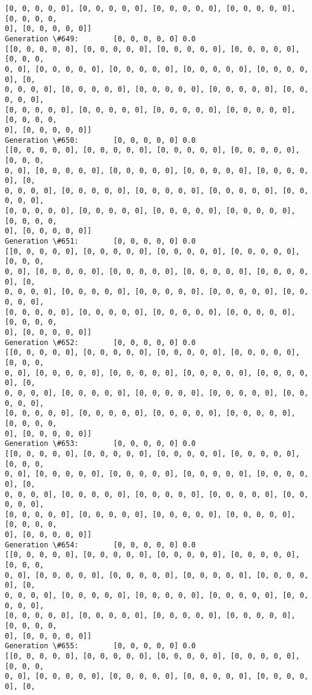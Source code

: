 \documentclass[11pt]{article}
\begin{document}
\begin{Verbatim}[commandchars=\\\{\}]
[0, 0, 0, 0, 0], [0, 0, 0, 0, 0], [0, 0, 0, 0, 0], [0, 0, 0, 0, 0], [0, 0, 0, 0,
0], [0, 0, 0, 0, 0]]
Generation \#649:        [0, 0, 0, 0, 0] 0.0
[[0, 0, 0, 0, 0], [0, 0, 0, 0, 0], [0, 0, 0, 0, 0], [0, 0, 0, 0, 0], [0, 0, 0,
0, 0], [0, 0, 0, 0, 0], [0, 0, 0, 0, 0], [0, 0, 0, 0, 0], [0, 0, 0, 0, 0], [0,
0, 0, 0, 0], [0, 0, 0, 0, 0], [0, 0, 0, 0, 0], [0, 0, 0, 0, 0], [0, 0, 0, 0, 0],
[0, 0, 0, 0, 0], [0, 0, 0, 0, 0], [0, 0, 0, 0, 0], [0, 0, 0, 0, 0], [0, 0, 0, 0,
0], [0, 0, 0, 0, 0]]
Generation \#650:        [0, 0, 0, 0, 0] 0.0
[[0, 0, 0, 0, 0], [0, 0, 0, 0, 0], [0, 0, 0, 0, 0], [0, 0, 0, 0, 0], [0, 0, 0,
0, 0], [0, 0, 0, 0, 0], [0, 0, 0, 0, 0], [0, 0, 0, 0, 0], [0, 0, 0, 0, 0], [0,
0, 0, 0, 0], [0, 0, 0, 0, 0], [0, 0, 0, 0, 0], [0, 0, 0, 0, 0], [0, 0, 0, 0, 0],
[0, 0, 0, 0, 0], [0, 0, 0, 0, 0], [0, 0, 0, 0, 0], [0, 0, 0, 0, 0], [0, 0, 0, 0,
0], [0, 0, 0, 0, 0]]
Generation \#651:        [0, 0, 0, 0, 0] 0.0
[[0, 0, 0, 0, 0], [0, 0, 0, 0, 0], [0, 0, 0, 0, 0], [0, 0, 0, 0, 0], [0, 0, 0,
0, 0], [0, 0, 0, 0, 0], [0, 0, 0, 0, 0], [0, 0, 0, 0, 0], [0, 0, 0, 0, 0], [0,
0, 0, 0, 0], [0, 0, 0, 0, 0], [0, 0, 0, 0, 0], [0, 0, 0, 0, 0], [0, 0, 0, 0, 0],
[0, 0, 0, 0, 0], [0, 0, 0, 0, 0], [0, 0, 0, 0, 0], [0, 0, 0, 0, 0], [0, 0, 0, 0,
0], [0, 0, 0, 0, 0]]
Generation \#652:        [0, 0, 0, 0, 0] 0.0
[[0, 0, 0, 0, 0], [0, 0, 0, 0, 0], [0, 0, 0, 0, 0], [0, 0, 0, 0, 0], [0, 0, 0,
0, 0], [0, 0, 0, 0, 0], [0, 0, 0, 0, 0], [0, 0, 0, 0, 0], [0, 0, 0, 0, 0], [0,
0, 0, 0, 0], [0, 0, 0, 0, 0], [0, 0, 0, 0, 0], [0, 0, 0, 0, 0], [0, 0, 0, 0, 0],
[0, 0, 0, 0, 0], [0, 0, 0, 0, 0], [0, 0, 0, 0, 0], [0, 0, 0, 0, 0], [0, 0, 0, 0,
0], [0, 0, 0, 0, 0]]
Generation \#653:        [0, 0, 0, 0, 0] 0.0
[[0, 0, 0, 0, 0], [0, 0, 0, 0, 0], [0, 0, 0, 0, 0], [0, 0, 0, 0, 0], [0, 0, 0,
0, 0], [0, 0, 0, 0, 0], [0, 0, 0, 0, 0], [0, 0, 0, 0, 0], [0, 0, 0, 0, 0], [0,
0, 0, 0, 0], [0, 0, 0, 0, 0], [0, 0, 0, 0, 0], [0, 0, 0, 0, 0], [0, 0, 0, 0, 0],
[0, 0, 0, 0, 0], [0, 0, 0, 0, 0], [0, 0, 0, 0, 0], [0, 0, 0, 0, 0], [0, 0, 0, 0,
0], [0, 0, 0, 0, 0]]
Generation \#654:        [0, 0, 0, 0, 0] 0.0
[[0, 0, 0, 0, 0], [0, 0, 0, 0, 0], [0, 0, 0, 0, 0], [0, 0, 0, 0, 0], [0, 0, 0,
0, 0], [0, 0, 0, 0, 0], [0, 0, 0, 0, 0], [0, 0, 0, 0, 0], [0, 0, 0, 0, 0], [0,
0, 0, 0, 0], [0, 0, 0, 0, 0], [0, 0, 0, 0, 0], [0, 0, 0, 0, 0], [0, 0, 0, 0, 0],
[0, 0, 0, 0, 0], [0, 0, 0, 0, 0], [0, 0, 0, 0, 0], [0, 0, 0, 0, 0], [0, 0, 0, 0,
0], [0, 0, 0, 0, 0]]
Generation \#655:        [0, 0, 0, 0, 0] 0.0
[[0, 0, 0, 0, 0], [0, 0, 0, 0, 0], [0, 0, 0, 0, 0], [0, 0, 0, 0, 0], [0, 0, 0,
0, 0], [0, 0, 0, 0, 0], [0, 0, 0, 0, 0], [0, 0, 0, 0, 0], [0, 0, 0, 0, 0], [0,

\end{Verbatim}
\end{document}
